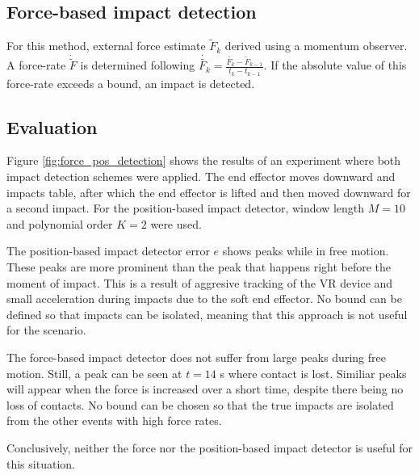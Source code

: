 \documentclass[11pt]{report}
\numberwithin{equation}{section}        %
\numberwithin{figure}{section}          %
\numberwithin{table}{section}           %
\begin{document}
  \subsection{Force-based impact detection}
  For this method, external force estimate $\tilde{F}_k$ derived using a momentum observer. A force-rate $\dot{\tilde{F}}$ is determined following $\dot{\tilde{F_k}}=\frac{\tilde{F_k}-\tilde{F}_{k-1}}{t_k-t_{k-1}}$. If the absolute value of this force-rate exceeds a bound, an impact is detected.

  \subsection{Evaluation}
  Figure \ref{fig:force_pos_detection} shows the results of an experiment where both impact detection schemes were applied. The end effector moves downward and impacts table, after which the end effector is lifted and then moved downward for a second impact. For the position-based impact detector, window length $M=10$ and polynomial order $K=2$ were used. 

  The position-based impact detector error $e$ shows peaks while in free motion. These peaks are more prominent than the peak that happens right before the moment of impact. This is a result of aggresive tracking of the VR device and small acceleration during impacts due to the soft end effector. No bound can be defined so that impacts can be isolated, meaning that this approach is not useful for the scenario.

  The force-based impact detector does not suffer from large peaks during free motion. Still, a peak can be seen at $t=14$ s where contact is lost. Similiar peaks will appear when the force is increased over a short time, despite there being no loss of contacts. No bound can be chosen so that the true impacts are isolated from the other events with high force rates.

  Conclusively, neither the force nor the position-based impact detector is useful for this situation.
\end{document}
